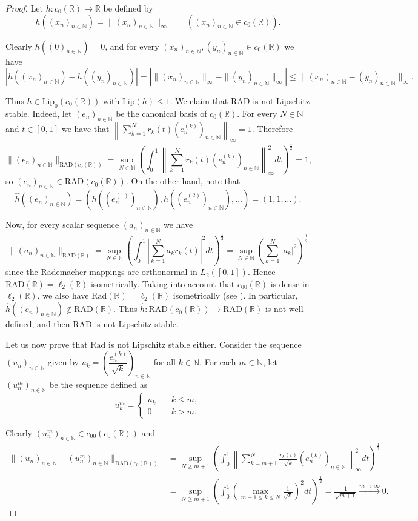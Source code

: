 \documentclass[12pt]{amsart}
\def\R{\mathbb{R}}
\def\N{\mathbb{N}}
\def\Lip{\mathrm{Lip}_0}
\def\Lipnorm{\mathrm{Lip}}
\def\Rad{\mathrm{Rad}}
\def\RAD{\mathrm{RAD}}
\begin{document}
\begin{proof}
	Let $h: c_0(\R) \to \R$ be defined by
	$$
	h((x_n)_{n\in\N})=\|(x_n)_{n\in\N}\|_\infty \qquad ((x_n)_{n\in\N}\in c_0(\R)).
	$$

	Clearly $h((0)_{n\in\N})=0$, and for every $(x_n)_{n\in\N},(y_n)_{n\in\N} \in c_0(\R)$ we have
	$$
	|h((x_n)_{n\in\N})-h((y_n)_{n\in\N})| = \left|\|(x_n)_{n\in\N}\|_\infty - \|(y_n)_{n\in\N}\|_\infty\right| \leq \|(x_n)_{n\in\N}-(y_n)_{n\in\N}\|_\infty.
	$$

	Thus $h \in\Lip(c_0(\R))$ with $\Lipnorm(h) \leq 1$. We claim that $\RAD$ is not Lipschitz stable. Indeed, let $(e_n)_{n\in\N}$ be the canonical basis of $c_0(\R)$. For every $N\in\N$ and $t \in [0,1]$ we have that $\left\| \sum_{k=1}^N r_k(t)(e_n^{(k)})_{n\in\N} \right\|_\infty =1$. Therefore
	$$
	\|(e_n)_{n\in\N}\|_{\RAD(c_0(\R))} = \sup_{N\in\N}\left( \int_0^1 \left\| \sum_{k=1}^N r_k(t)(e_n^{(k)})_{n\in\N} \right\|_\infty^2 dt \right)^{\frac{1}{2}}=1,
	$$
	so $(e_n)_{n\in\N} \in \RAD(c_0(\R))$. On the other hand, note that
	$$
	\hat{h}((e_n)_{n\in\N}) = (h((e_n^{(1)})_{n\in\N}),h((e_n^{(2)})_{n\in\N}),\ldots) = (1,1,\ldots).
	$$

	Now, for every scalar sequence $(a_n)_{n\in\N}$ we have
	$$
	\|(a_n)_{n\in\N}\|_{\RAD(\R)} = \sup_{N\in\N}\left( \int_0^1 \left| \sum_{k=1}^N a_k r_k(t) \right|^2 dt \right)^{\frac{1}{2}} = \sup_{N\in\N}\left( \sum_{k=1}^N |a_k|^2 \right)^{\frac{1}{2}}
	$$
	since the Rademacher mappings are orthonormal in $L_2([0,1])$. Hence  $\RAD(\R) = \ell_2(\R)$ isometrically. Taking into account that $c_{00}(\R)$ is dense in $\ell_2(\R)$, we also have $\Rad(\R) = \ell_2(\R)$ isometrically (see \cite[p. 234]{DieJarTon-95}). In particular, $\hat{h}((e_n)_{n\in\N}) \notin \RAD(\R)$. Thus $\hat{h}:\RAD(c_0(\R)) \to \RAD(\R)$ is not well-defined, and then $\RAD$ is not Lipschitz stable.

	Let us now prove that $\Rad$ is not Lipschitz stable either. Consider the sequence $(u_n)_{n\in\N}$ given by $u_k = \left(\dfrac{e_n^{(k)}}{\sqrt{k}}\right)_{n\in\N}$ for all $k\in\N$. For each $m\in\N$, let $(u_n^m)_{n\in\N}$ be the sequence defined as
	$$
	u_k^m = \begin{cases}
	u_k \quad & k\leq m,\\
	0 \quad & k > m.
	\end{cases}
	$$

	Clearly $(u_n^m)_{n\in\N} \in c_{00}(c_0(\R))$ and
	\begin{align*}
	\|(u_n)_{n\in\N}-(u_n^m)_{n\in\N}\|_{\RAD(c_0(\R))} &= \sup_{N \geq m+1} \left(\int_0^1 \left\| \sum_{k=m+1}^N \frac{r_k(t)}{\sqrt{k}}(e_n^{(k)})_{n\in\N} \right\|_\infty^2 dt \right)^{\frac{1}{2}}\\
	&= \sup_{N \geq m+1} \left( \int_0^1 \left( \max_{m+1 \leq k \leq N} \frac{1}{\sqrt{k}} \right)^2 dt \right)^{\frac{1}{2}} = \frac{1}{\sqrt{m+1}} \xrightarrow{m\to\infty} 0.
	\end{align*}


\end{proof}
\end{document}
